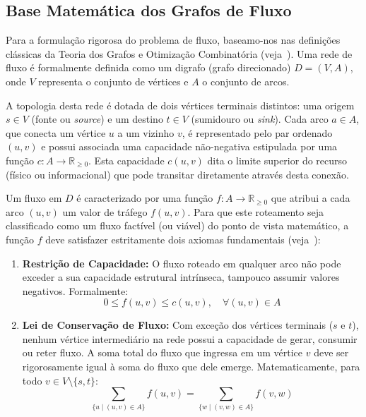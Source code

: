 \documentclass[12pt,a4paper]{article}
\begin{document}
\subsection{Base Matemática dos Grafos de Fluxo}

Para a formulação rigorosa do problema de fluxo, baseamo-nos nas definições clássicas da Teoria dos Grafos e Otimização Combinatória (veja~\cite{ahuja1993network, bondy2008graph}). Uma rede de fluxo é formalmente definida como um digrafo (grafo direcionado) $D = (V, A)$, onde $V$ representa o conjunto de vértices e $A$ o conjunto de arcos.

A topologia desta rede é dotada de dois vértices terminais distintos: uma origem $s \in V$ (fonte ou \textit{source}) e um destino $t \in V$ (sumidouro ou \textit{sink}). Cada arco $a \in A$, que conecta um vértice $u$ a um vizinho $v$, é representado pelo par ordenado $(u,v)$ e possui associada uma capacidade não-negativa estipulada por uma função $c: A \rightarrow \mathbb{R}_{\ge 0}$. Esta capacidade $c(u,v)$ dita o limite superior do recurso (físico ou informacional) que pode transitar diretamente através desta conexão.

Um fluxo em $D$ é caracterizado por uma função $f: A \rightarrow \mathbb{R}_{\ge 0}$ que atribui a cada arco $(u,v)$ um valor de tráfego $f(u,v)$. Para que este roteamento seja classificado como um fluxo factível (ou viável) do ponto de vista matemático, a função $f$ deve satisfazer estritamente dois axiomas fundamentais (veja~\cite{ford1956maximal, cook1998combinatorial}):

\begin{enumerate}
    \item \textbf{Restrição de Capacidade:} O fluxo roteado em qualquer arco não pode exceder a sua capacidade estrutural intrínseca, tampouco assumir valores negativos. Formalmente:
    \begin{equation}
        0 \le f(u,v) \le c(u,v), \quad \forall (u,v) \in A
    \end{equation}

    \item \textbf{Lei de Conservação de Fluxo:} Com exceção dos vértices terminais ($s$ e $t$), nenhum vértice intermediário na rede possui a capacidade de gerar, consumir ou reter fluxo. A soma total do fluxo que ingressa em um vértice $v$ deve ser rigorosamente igual à soma do fluxo que dele emerge. Matematicamente, para todo $v \in V \setminus \{s, t\}$:
    \begin{equation}
        \sum_{\{u \mid (u,v) \in A\}} f(u,v) = \sum_{\{w \mid (v,w) \in A\}} f(v,w)
    \end{equation}
\end{enumerate}
\end{document}
